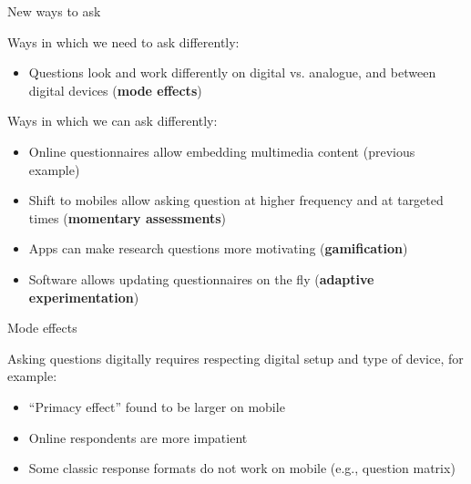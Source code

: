 \documentclass[aspectratio=169]{beamer}
\begin{document}
\begin{frame}{New ways to ask}

Ways in which we need to ask differently:

\begin{itemize}
    \item Questions look and work differently on digital vs. analogue, and between digital devices (\textbf{mode effects})
\end{itemize}
\pause

Ways in which we can ask differently:

\begin{itemize}
    \item Online questionnaires allow embedding multimedia content (previous example)
    \pause
    \item Shift to mobiles allow asking question at higher frequency and at targeted times (\textbf{momentary assessments})
    \pause
    \item Apps can make research questions more motivating (\textbf{gamification})
    \pause
    \item Software allows updating questionnaires on the fly (\textbf{adaptive experimentation}) 
\end{itemize}


\end{frame}
\begin{frame}{Mode effects}

Asking questions digitally requires respecting digital setup and type of device, for example:

\begin{itemize}
    \item ``Primacy effect'' found to be larger on mobile
    \item Online respondents are more impatient
    \item Some classic response formats do not work on mobile (e.g., question matrix)
\end{itemize}

\end{frame}
\end{document}
